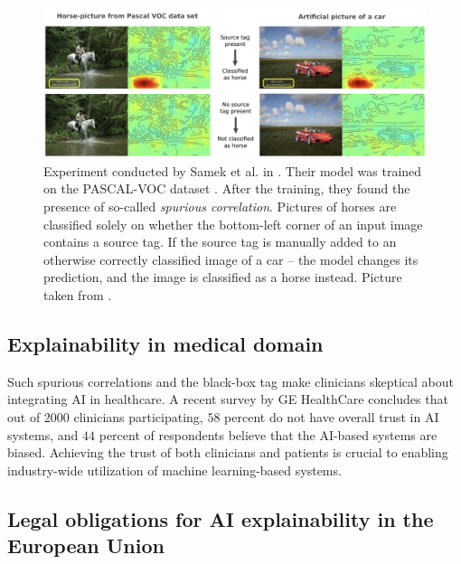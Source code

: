 \begin{figure}[!h]
    \begin{center}
    \begin{minipage}{1\textwidth}
      \includegraphics[width=\textwidth]{img/horse-tag.png}
    \end{minipage}
    \caption{Experiment conducted by Samek et al. in \cite{xai-horse}. Their model was trained on the PASCAL-VOC dataset \cite{pascal-voc}. After the training, they found the presence of so-called \emph{spurious correlation}. Pictures of horses are classified solely on whether the bottom-left corner of an input image contains a source tag. If the source tag is manually added to an otherwise correctly classified image of a car -- the model changes its prediction, and the image is classified as a horse instead. Picture taken from \cite{xai-horse}.}
    \label{fig:horse-tag}
    \end{center}

\end{figure}

\subsection*{Explainability in medical domain}

Such spurious correlations and the black-box tag make clinicians skeptical about integrating AI in healthcare.
A recent survey by GE HealthCare \cite{ge-healthcare-survey} concludes that out of 2000 clinicians participating, $58$ percent do not have overall trust in AI systems, and $44$ percent of respondents believe that the AI-based systems are biased.
Achieving the trust of both clinicians and patients is crucial to enabling industry-wide utilization of machine learning-based systems.

\subsection*{Legal obligations for AI explainability in the European Union}

